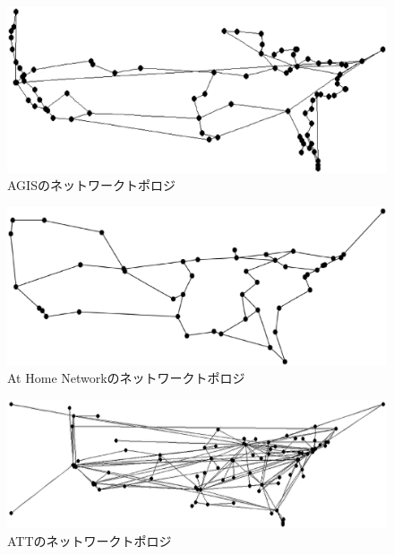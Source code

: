 \documentclass[a4j,11pt]{jreport}
\begin{document}
\begin{figure}[htbp]
  \centering
  \includegraphics[scale=0.555]{data/AGIS.eps}
  \vspace{0mm}
  \caption{AGISのネットワークトポロジ}
  \label{fig:AGIS}
\end{figure}

\bigskip

\begin{figure}[htbp]
  \centering
  \includegraphics[scale=0.526]{data/At_Home_Network.eps}
  \vspace{0mm}
  \caption{At Home Networkのネットワークトポロジ}
  \label{fig:At}
\end{figure}

\begin{figure}[htbp]
  \centering
  \includegraphics[scale=0.415]{data/ATT.eps}
  \vspace{0mm}
  \caption{ATTのネットワークトポロジ}
  \label{fig:ATT}
\end{figure}
\end{document}
